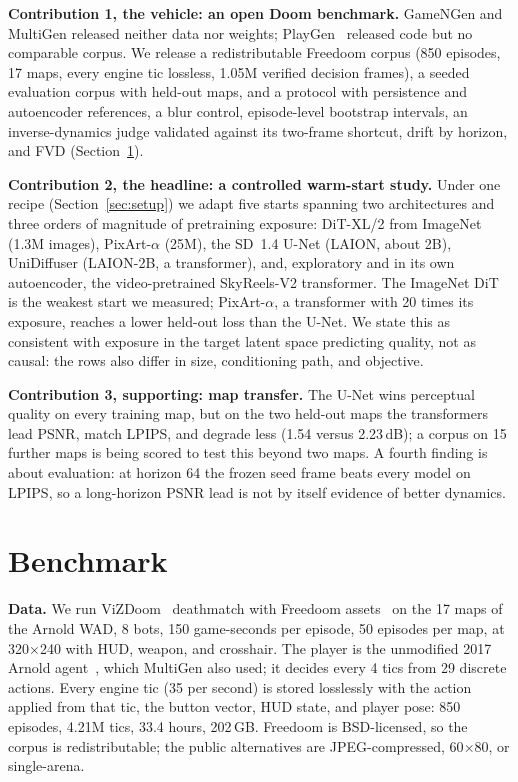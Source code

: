 \documentclass[10pt]{article}
\begin{document}
\textbf{Contribution 1, the vehicle: an open Doom benchmark.} GameNGen and MultiGen released neither data nor weights; PlayGen~\citep{playgen2024} released code but no comparable corpus. We release a redistributable Freedoom corpus (850 episodes, 17 maps, every engine tic lossless, 1.05M verified decision frames), a seeded evaluation corpus with held-out maps, and a protocol with persistence and autoencoder references, a blur control, episode-level bootstrap intervals, an inverse-dynamics judge validated against its two-frame shortcut, drift by horizon, and FVD (Section~\ref{sec:bench}).

\textbf{Contribution 2, the headline: a controlled warm-start study.} Under one recipe (Section~\ref{sec:setup}) we adapt five starts spanning two architectures and three orders of magnitude of pretraining exposure: DiT-XL/2 from ImageNet (1.3M images), PixArt-$\alpha$ (25M), the SD~1.4 U-Net (LAION, about 2B), UniDiffuser (LAION-2B, a transformer), and, exploratory and in its own autoencoder, the video-pretrained SkyReels-V2 transformer. The ImageNet DiT is the weakest start we measured; PixArt-$\alpha$, a transformer with 20 times its exposure, reaches a lower held-out loss than the U-Net. We state this as consistent with exposure in the target latent space predicting quality, not as causal: the rows also differ in size, conditioning path, and objective.

\textbf{Contribution 3, supporting: map transfer.} The U-Net wins perceptual quality on every training map, but on the two held-out maps the transformers lead PSNR, match LPIPS, and degrade less (1.54 versus 2.23\,dB); a corpus on 15 further maps is being scored to test this beyond two maps. A fourth finding is about evaluation: at horizon 64 the frozen seed frame beats every model on LPIPS, so a long-horizon PSNR lead is not by itself evidence of better dynamics.

\section{Benchmark}
\label{sec:bench}
\textbf{Data.} We run ViZDoom~\citep{kempka2016vizdoom} deathmatch with Freedoom assets~\citep{freedoom} on the 17 maps of the Arnold WAD, 8 bots, 150 game-seconds per episode, 50 episodes per map, at 320$\times$240 with HUD, weapon, and crosshair. The player is the unmodified 2017 Arnold agent~\citep{lample2017arnold}, which MultiGen also used; it decides every 4 tics from 29 discrete actions. Every engine tic (35 per second) is stored losslessly with the action applied from that tic, the button vector, HUD state, and player pose: 850 episodes, 4.21M tics, 33.4 hours, 202\,GB. Freedoom is BSD-licensed, so the corpus is redistributable; the public alternatives are JPEG-compressed, 60$\times$80, or single-arena.
\end{document}
